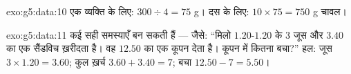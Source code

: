 \begin{solution}{exo:g5:data:10}
एक व्यक्ति के लिए: $300 \div 4 = 75$ g। दस के लिए:
$10 \times 75 = 750$ g चावल।
\end{solution}

\begin{solution}{exo:g5:data:11}
कई सही समस्याएँ बन सकती हैं --- जैसे: ``मिलो $1.20$-$1.20$ के
$3$ जूस और $3.40$ का एक सैंडविच ख़रीदता है। वह $12.50$ का एक
कूपन देता है। कूपन में कितना बचा?'' हल: जूस
$3 \times 1.20 = 3.60$; कुल ख़र्च $3.60 + 3.40 = 7$; बचा
$12.50 - 7 = 5.50$।

\end{solution}
